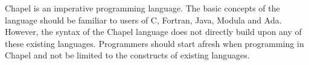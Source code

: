Chapel is an imperative programming language.  The basic concepts of the
language should be familiar to users of C, Fortran, Java, Modula and Ada.
However, the syntax of the Chapel language does not directly build upon any of 
these existing languages.   Programmers should start afresh when programming in 
Chapel and not be limited to the constructs of existing languages.

